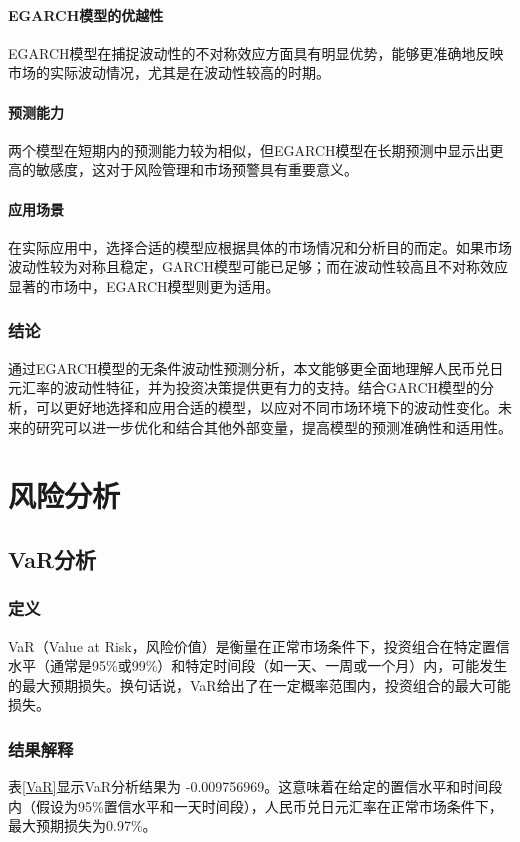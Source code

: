 \paragraph{EGARCH模型的优越性}EGARCH模型在捕捉波动性的不对称效应方面具有明显优势，能够更准确地反映市场的实际波动情况，尤其是在波动性较高的时期。
\paragraph{预测能力}两个模型在短期内的预测能力较为相似，但EGARCH模型在长期预测中显示出更高的敏感度，这对于风险管理和市场预警具有重要意义。
\paragraph{应用场景}在实际应用中，选择合适的模型应根据具体的市场情况和分析目的而定。如果市场波动性较为对称且稳定，GARCH模型可能已足够；而在波动性较高且不对称效应显著的市场中，EGARCH模型则更为适用。

\subsubsection{结论}
通过EGARCH模型的无条件波动性预测分析，本文能够更全面地理解人民币兑日元汇率的波动性特征，并为投资决策提供更有力的支持。结合GARCH模型的分析，可以更好地选择和应用合适的模型，以应对不同市场环境下的波动性变化。未来的研究可以进一步优化和结合其他外部变量，提高模型的预测准确性和适用性。

\section{风险分析}
\subsection{VaR分析}
\subsubsection{定义}
VaR（Value at Risk，风险价值）是衡量在正常市场条件下，投资组合在特定置信水平（通常是95\%或99\%）和特定时间段（如一天、一周或一个月）内，可能发生的最大预期损失。换句话说，VaR给出了在一定概率范围内，投资组合的最大可能损失。

\subsubsection{结果解释}
表\ref{VaR}显示VaR分析结果为 -0.009756969。这意味着在给定的置信水平和时间段内（假设为95\%置信水平和一天时间段），人民币兑日元汇率在正常市场条件下，最大预期损失为0.97\%。

